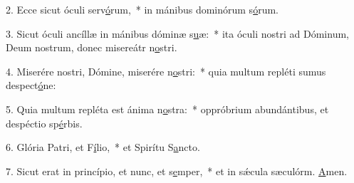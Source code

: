 2. Ecce sicut óculi serv\uline{ó}rum,~* in mánibus dominórum s\uline{ó}rum.\par 
3. Sicut óculi ancíllæ in mánibus dóminæ s\uline{u}æ:~* ita óculi nostri ad Dóminum, Deum nostrum, donec misereátr n\uline{o}stri.\par 
4. Miserére nostri, Dómine, miserére n\uline{o}stri:~* quia multum repléti sumus despect\uline{ó}ne:\par 
5. Quia multum repléta est ánima n\uline{o}stra:~* oppróbrium abundántibus, et despéctio sp\uline{é}rbis.\par 
6. Glória Patri, et F\uline{í}lio,~* et Spirítu S\uline{a}ncto.\par 
7. Sicut erat in princípio, et nunc, et s\uline{e}mper,~* et in sǽcula sæculórm. \uline{A}men.\par 
